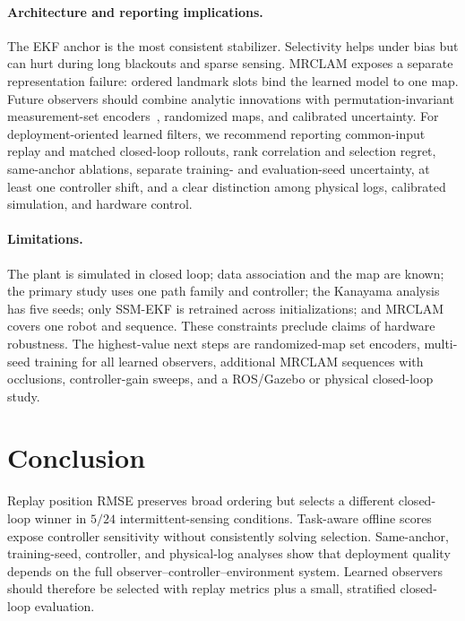 \documentclass{article}
\begin{document}
\paragraph{Architecture and reporting implications.}
The EKF anchor is the most consistent stabilizer. Selectivity helps under bias but can hurt during long blackouts and sparse sensing. MRCLAM exposes a separate representation failure: ordered landmark slots bind the learned model to one map. Future observers should combine analytic innovations with permutation-invariant measurement-set encoders~\citep{zaheer2017deepsets,lee2019settransformer}, randomized maps, and calibrated uncertainty. For deployment-oriented learned filters, we recommend reporting common-input replay and matched closed-loop rollouts, rank correlation and selection regret, same-anchor ablations, separate training- and evaluation-seed uncertainty, at least one controller shift, and a clear distinction among physical logs, calibrated simulation, and hardware control.

\paragraph{Limitations.}
The plant is simulated in closed loop; data association and the map are known; the primary study uses one path family and controller; the Kanayama analysis has five seeds; only SSM-EKF is retrained across initializations; and MRCLAM covers one robot and sequence. These constraints preclude claims of hardware robustness. The highest-value next steps are randomized-map set encoders, multi-seed training for all learned observers, additional MRCLAM sequences with occlusions, controller-gain sweeps, and a ROS/Gazebo or physical closed-loop study.

\section{Conclusion}
Replay position RMSE preserves broad ordering but selects a different closed-loop winner in $5/24$ intermittent-sensing conditions. Task-aware offline scores expose controller sensitivity without consistently solving selection. Same-anchor, training-seed, controller, and physical-log analyses show that deployment quality depends on the full observer--controller--environment system. Learned observers should therefore be selected with replay metrics plus a small, stratified closed-loop evaluation.
\end{document}
